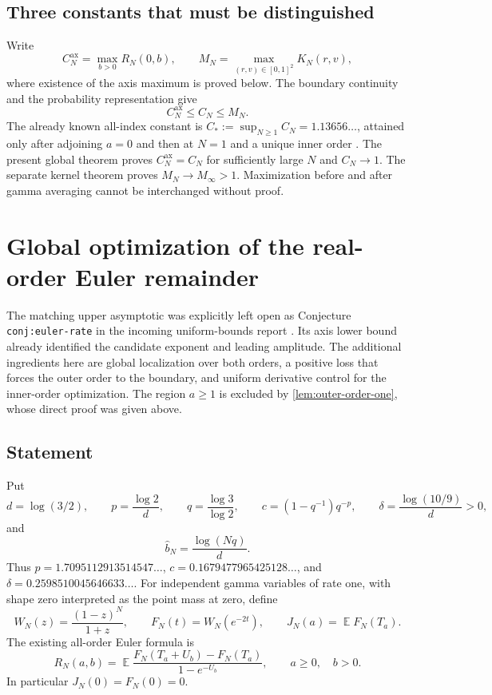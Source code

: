 \documentclass[11pt]{article}
\numberwithin{equation}{section}
\theoremstyle{definition}
\theoremstyle{remark}
\DeclareMathOperator{\E}{\mathbb E}
\begin{document}
\subsection{Three constants that must be distinguished}

Write
\[
 C_N^{\mathrm{ax}}=\max_{b>0}R_N(0,b),\qquad
 M_N=\max_{(r,v)\in[0,1]^2}K_N(r,v),
\]
where existence of the axis maximum is proved below. The boundary
continuity and the probability representation give
\begin{equation}\label{eq:constant-hierarchy}
 C_N^{\mathrm{ax}}\leq C_N\leq M_N.
\end{equation}
The already known all-index constant is
$C_*:=\sup_{N\geq1}C_N=1.13656\ldots$, attained only after adjoining
$a=0$ and then at $N=1$ and a unique inner order
\cite{ProveItSnapshot,SharpEulerIncoming}. The present global theorem
proves $C_N^{\mathrm{ax}}=C_N$ for sufficiently large $N$ and $C_N\to1$. The separate
kernel theorem proves $M_N\to M_\infty>1$. Maximization before and after
gamma averaging cannot be interchanged without proof.


\section{Global optimization of the real-order Euler remainder}
\label{eul:sec:global}
The matching upper asymptotic was explicitly left open as Conjecture
\texttt{conj:euler-rate} in the incoming uniform-bounds report
\cite{UniformBoundsIncoming}. Its axis lower bound already identified
the candidate exponent and leading amplitude. The additional ingredients
here are global localization over both orders, a positive loss that
forces the outer order to the boundary, and uniform derivative control
for the inner-order optimization. The region $a\geq1$ is excluded by
\cref{lem:outer-order-one}, whose direct proof was given above.

\subsection{Statement}
Put
\[
 d=\log(3/2),\qquad p=\frac{\log2}{d},\qquad
 q=\frac{\log3}{\log2},\qquad
 c=(1-q^{-1})q^{-p},\qquad
 \delta=\frac{\log(10/9)}d>0,
\]
and
\[
 \widehat b_N=\frac{\log(Nq)}d.
\]
Thus $p=1.7095112913514547\ldots$,
$c=0.1679477965425128\ldots$, and
$\delta=0.2598510045646633\ldots$.
For independent gamma variables of rate one, with shape zero interpreted
as the point mass at zero, define
\[
 W_N(z)=\frac{(1-z)^N}{1+z},\qquad
 F_N(t)=W_N(e^{-2t}),\qquad
 J_N(a)=\E F_N(T_a).
\]
The existing all-order Euler formula is
\begin{equation}\label{eul:eq:R}
 R_N(a,b)=\E\frac{F_N(T_a+U_b)-F_N(T_a)}{1-e^{-U_b}},
 \qquad a\geq0,\quad b>0.
\end{equation}
In particular $J_N(0)=F_N(0)=0$.
\end{document}
